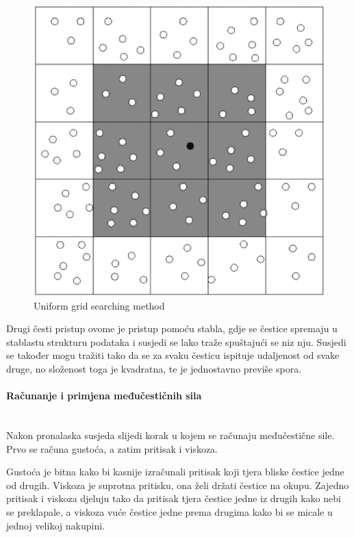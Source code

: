 \documentclass[diplomskirad]{fer}
\newcommand{\paragraphnewline}[1]{\paragraph{#1}\mbox{}\\}
\begin{document}
    \begin{figure}[H]
        \centering
        \includegraphics[scale=0.3]{images/Uniform-grid-searching-method}
        \caption{
            Uniform grid searching method \cite{uniformGridSearchingMethod}
        }
        \label{fig:uniformGridSearchingMethod}
    \end{figure}

    Drugi česti pristup ovome je pristup pomoću stabla, gdje se čestice spremaju u stablastu strukturu podataka i susjedi se lako traže spuštajući se niz nju.
    Susjedi se također mogu tražiti tako da se za svaku česticu ispituje udaljenost od svake druge, no složenost toga je kvadratna, te je jednostavno previše spora.


    \newpage
    \paragraphnewline{Računanje i primjena međučestičnih sila}

    Nakon pronalaska susjeda slijedi korak u kojem se računaju međučestične sile.
    Prvo se računa gustoća, a zatim pritisak i viskoza.

    Gustoća je bitna kako bi kasnije izračunali pritisak koji tjera bliske čestice jedne od drugih.
    Viskoza je suprotna pritisku, ona želi držati čestice na okupu.
    Zajedno pritisak i viskoza djeluju tako da pritisak tjera čestice jedne iz drugih kako nebi se preklapale, a
    viskoza vuće čestice jedne prema drugima kako bi se micale u jednoj velikoj nakupini.
\end{document}

